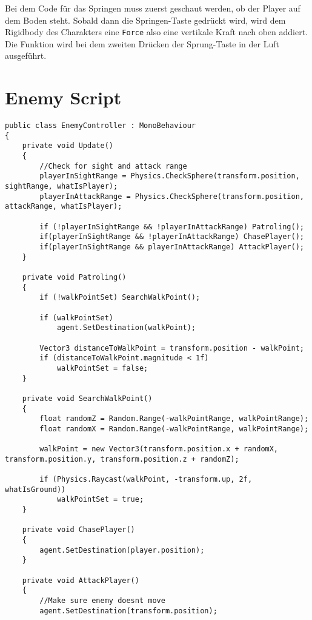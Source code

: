 Bei dem Code für das Springen muss zuerst geschaut werden, ob der Player auf dem Boden steht. Sobald dann die Springen-Taste gedrückt wird, wird dem Rigidbody des Charakters eine \verb+Force+ also eine vertikale Kraft nach oben addiert. Die Funktion wird bei dem zweiten Drücken der Sprung-Taste in der Luft ausgeführt.

\pagebreak
\section{Enemy Script}

\begin{lstlisting}[language=CSharp,caption={EnemyController},label=code:]
public class EnemyController : MonoBehaviour
{
    private void Update()
    {
        //Check for sight and attack range
        playerInSightRange = Physics.CheckSphere(transform.position, sightRange, whatIsPlayer);
        playerInAttackRange = Physics.CheckSphere(transform.position, attackRange, whatIsPlayer);

        if (!playerInSightRange && !playerInAttackRange) Patroling();
        if(playerInSightRange && !playerInAttackRange) ChasePlayer();
        if(playerInSightRange && playerInAttackRange) AttackPlayer();
    }

    private void Patroling()
    {
        if (!walkPointSet) SearchWalkPoint();

        if (walkPointSet)
            agent.SetDestination(walkPoint);

        Vector3 distanceToWalkPoint = transform.position - walkPoint;
        if (distanceToWalkPoint.magnitude < 1f)
            walkPointSet = false;
    }

    private void SearchWalkPoint()
    {
        float randomZ = Random.Range(-walkPointRange, walkPointRange);
        float randomX = Random.Range(-walkPointRange, walkPointRange);

        walkPoint = new Vector3(transform.position.x + randomX, transform.position.y, transform.position.z + randomZ);

        if (Physics.Raycast(walkPoint, -transform.up, 2f, whatIsGround))
            walkPointSet = true;
    }

    private void ChasePlayer()
    {
        agent.SetDestination(player.position);
    }

    private void AttackPlayer()
    {
        //Make sure enemy doesnt move
        agent.SetDestination(transform.position);
        

\end{lstlisting}
